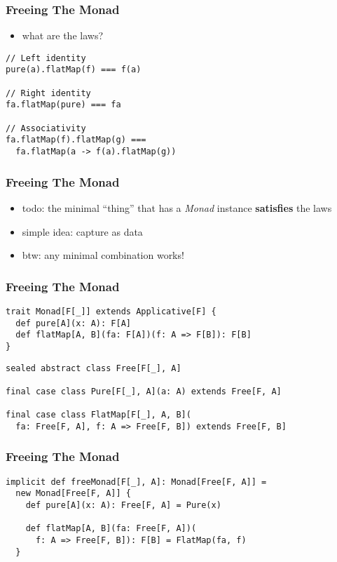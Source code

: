 \documentclass{beamer}
\begin{document}
\begin{frame}[fragile]
  \frametitle{Freeing The Monad}
\begin{itemize}
  \item what are the laws?
\end{itemize}
    \begin{center}
\begin{verbatim}
// Left identity
pure(a).flatMap(f) === f(a)

// Right identity
fa.flatMap(pure) === fa

// Associativity
fa.flatMap(f).flatMap(g) ===
  fa.flatMap(a -> f(a).flatMap(g))
\end{verbatim}
    \end{center}
\end{frame}

\begin{frame}[fragile]
  \frametitle{Freeing The Monad}
  \begin{itemize}
  \item todo: the minimal ``thing'' that has a \textit{Monad} instance
    \textbf{satisfies} the laws
  \item simple idea: capture as data
  \item btw: any minimal combination works!
  \end{itemize}
\end{frame}

\begin{frame}[fragile]
  \frametitle{Freeing The Monad}
    \begin{center}
\begin{verbatim}
trait Monad[F[_]] extends Applicative[F] {
  def pure[A](x: A): F[A]
  def flatMap[A, B](fa: F[A])(f: A => F[B]): F[B]
}
\end{verbatim}
\vspace{1cm}
\begin{verbatim}
sealed abstract class Free[F[_], A]

final case class Pure[F[_], A](a: A) extends Free[F, A]

final case class FlatMap[F[_], A, B](
  fa: Free[F, A], f: A => Free[F, B]) extends Free[F, B]
  \end{verbatim}
\end{center}
\end{frame}

\begin{frame}[fragile]
  \frametitle{Freeing The Monad}
    \begin{center}
\begin{verbatim}
implicit def freeMonad[F[_], A]: Monad[Free[F, A]] =
  new Monad[Free[F, A]] {
    def pure[A](x: A): Free[F, A] = Pure(x)

    def flatMap[A, B](fa: Free[F, A])(
      f: A => Free[F, B]): F[B] = FlatMap(fa, f)
  }
\end{verbatim}
\end{center}
\end{frame}
\end{document}
